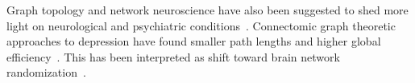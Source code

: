 Graph topology and network neuroscience have also been suggested to shed more light on neurological and psychiatric conditions~\parencite{Fornito2013}.
Connectomic graph theoretic approaches to depression have found smaller path lengths and higher global efficiency~\parencite{Zhang2011}.
This has been interpreted as shift toward brain network randomization~\parencite{Gong2015}.
